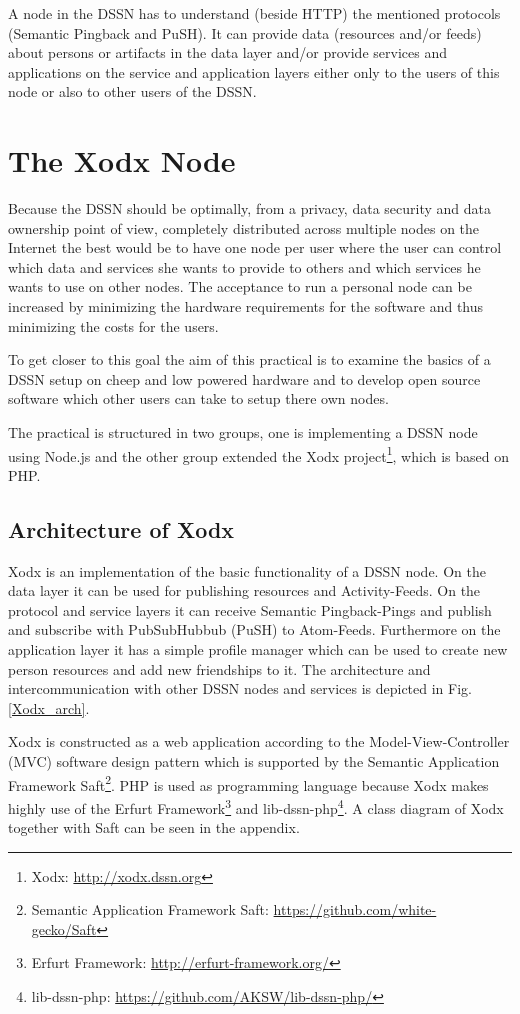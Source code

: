 \documentclass{llncs}
\begin{document}
A node in the DSSN has to understand (beside HTTP) the mentioned protocols (Semantic Pingback and PuSH).
It can provide data (resources and/or feeds) about persons or artifacts in the data layer and/or provide services and applications on the service and application layers either only to the users of this node or also to other users of the DSSN.

\section{The Xodx Node}
Because the DSSN should be optimally, from a privacy, data security and data ownership point of view, completely distributed across multiple nodes on the Internet the best would be to have one node per user where the user can control which data and services she wants to provide to others and which services he wants to use on other nodes.
The acceptance to run a personal node can be increased by minimizing the hardware requirements for the software and thus minimizing the costs for the users.

To get closer to this goal the aim of this practical is to examine the basics of a DSSN setup on cheep and low powered hardware and to develop open source software which other users can take to setup there own nodes.

The practical is structured in two groups, one is implementing a DSSN node using Node.js and the other group extended the Xodx project\footnote{Xodx: \url{http://xodx.dssn.org}}, which is based on PHP.

\subsection{Architecture of Xodx}
Xodx is an implementation of the basic functionality of a DSSN node.
On the data layer it can be used for publishing resources and Activity-Feeds.
On the protocol and service layers it can receive Semantic Pingback-Pings and publish and subscribe with PubSubHubbub (PuSH) to Atom-Feeds.
Furthermore on the application layer it has a simple profile manager which can be used to create new person resources and add new friendships to it.
The architecture and intercommunication with other DSSN nodes and services is depicted in Fig. \ref{Xodx_arch}.

Xodx is constructed as a web application according to the Model-View-Controller (MVC) software design pattern which is supported by the Semantic Application Framework Saft\footnote{Semantic Application Framework Saft: \url{https://github.com/white-gecko/Saft}}.
PHP is used as programming language because Xodx makes highly use of the Erfurt Framework\footnote{Erfurt Framework: \url{http://erfurt-framework.org/}} and lib-dssn-php\footnote{lib-dssn-php: \url{https://github.com/AKSW/lib-dssn-php/}}.
A class diagram of Xodx together with Saft can be seen in the appendix.
\end{document}
